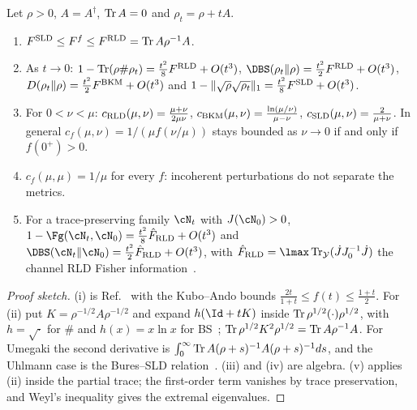 \begin{proposition}\label{gate:prop:H}
Let $\rho>0$, $A=A^\dagger$, $\operatorname{Tr} A=0$ and $\rho_t=\rho+tA$.
\begin{enumerate}
\item[(i)] $F^{\rm SLD}\le F^f\le F^{\rm RLD}=\operatorname{Tr} A\rho^{-1}A$.
\item[(ii)] As $t\to0$: $1-\operatorname{Tr}(\rho\#\rho_t)=\frac{t^2}8F^{\rm RLD}+O(t^3)$, $\DBS(\rho_t\|\rho)=\frac{t^2}2F^{\rm RLD}+O(t^3)$, $D(\rho_t\|\rho)=\frac{t^2}2F^{\rm BKM}+O(t^3)$ and $1-\|\sqrt\rho\sqrt{\rho_t}\|_1=\frac{t^2}8F^{\rm SLD}+O(t^3)$.
\item[(iii)] For $0<\nu<\mu$: $c_{\rm RLD}(\mu,\nu)=\frac{\mu+\nu}{2\mu\nu}$, $c_{\rm BKM}(\mu,\nu)=\frac{\ln(\mu/\nu)}{\mu-\nu}$, $c_{\rm SLD}(\mu,\nu)=\frac2{\mu+\nu}$. In general $c_f(\mu,\nu)=1/(\mu f(\nu/\mu))$ stays bounded as $\nu\to0$ if and only if $f(0^+)>0$.
\item[(iv)] $c_f(\mu,\mu)=1/\mu$ for every $f$: incoherent perturbations do not separate the metrics.
\item[(v)] For a trace-preserving family $\cN_t$ with $J(\cN_0)>0$, $1-\Fg(\cN_t,\cN_0)=\frac{t^2}{8}\hat F_{\rm RLD}+O(t^3)$ and $\DBS(\cN_t\|\cN_0)=\frac{t^2}{2}\hat F_{\rm RLD}+O(t^3)$, with $\hat F_{\rm RLD}=\lmax\Tr_{\mathcal Y}(\dot JJ_0^{-1}\dot J)$ the channel RLD Fisher information~\cite{KatariyaWilde2021b}.
\end{enumerate}
\end{proposition}

\begin{proof}[Proof sketch]
(i) is Ref.~\cite{Petz1996} with the Kubo--Ando bounds $\frac{2t}{1+t}\le f(t)\le\frac{1+t}{2}$. For (ii) put $K=\rho^{-1/2}A\rho^{-1/2}$ and expand $h(\Id+tK)$ inside $\operatorname{Tr}\rho^{1/2}(\cdot)\rho^{1/2}$, with $h=\sqrt{\cdot}$ for $\#$ and $h(x)=x\ln x$ for BS~\cite{HiaiMosonyi2017}; $\operatorname{Tr}\rho^{1/2}K^2\rho^{1/2}=\operatorname{Tr} A\rho^{-1}A$. For Umegaki the second derivative is $\int_0^\infty\operatorname{Tr} A(\rho+s)^{-1}A(\rho+s)^{-1}ds$, and the Uhlmann case is the Bures--SLD relation~\cite{BraunsteinCaves1994}. (iii) and (iv) are algebra. (v) applies (ii) inside the partial trace; the first-order term vanishes by trace preservation, and Weyl's inequality gives the extremal eigenvalues.
\end{proof}

